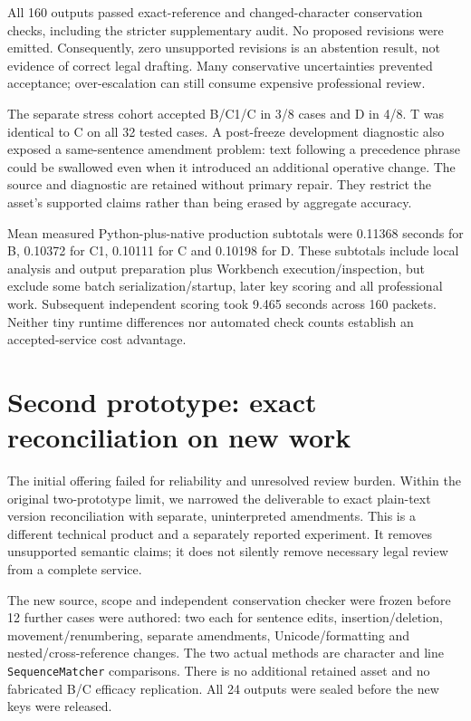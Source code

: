 \documentclass[10pt,a4paper]{article}
\begin{document}
All 160 outputs passed exact-reference and changed-character conservation checks, including the stricter supplementary audit. No proposed revisions were emitted. Consequently, zero unsupported revisions is an abstention result, not evidence of correct legal drafting. Many conservative uncertainties prevented acceptance; over-escalation can still consume expensive professional review.

The separate stress cohort accepted B/C1/C in 3/8 cases and D in 4/8. T was identical to C on all 32 tested cases. A post-freeze development diagnostic also exposed a same-sentence amendment problem: text following a precedence phrase could be swallowed even when it introduced an additional operative change. The source and diagnostic are retained without primary repair. They restrict the asset's supported claims rather than being erased by aggregate accuracy.

Mean measured Python-plus-native production subtotals were 0.11368 seconds for B, 0.10372 for C1, 0.10111 for C and 0.10198 for D. These subtotals include local analysis and output preparation plus Workbench execution/inspection, but exclude some batch serialization/startup, later key scoring and all professional work. Subsequent independent scoring took 9.465 seconds across 160 packets. Neither tiny runtime differences nor automated check counts establish an accepted-service cost advantage.

\section{Second prototype: exact reconciliation on new work}
The initial offering failed for reliability and unresolved review burden. Within the original two-prototype limit, we narrowed the deliverable to exact plain-text version reconciliation with separate, uninterpreted amendments. This is a different technical product and a separately reported experiment. It removes unsupported semantic claims; it does not silently remove necessary legal review from a complete service.

The new source, scope and independent conservation checker were frozen before 12 further cases were authored: two each for sentence edits, insertion/deletion, movement/renumbering, separate amendments, Unicode/formatting and nested/cross-reference changes. The two actual methods are character and line \texttt{SequenceMatcher} comparisons. There is no additional retained asset and no fabricated B/C efficacy replication. All 24 outputs were sealed before the new keys were released.
\end{document}
